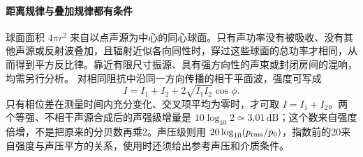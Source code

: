 \paragraph{距离规律与叠加规律都有条件}
球面面积 $4\pi r^2$ 来自以点声源为中心的同心球面。只有声功率没有被吸收、没有其他声源或反射波叠加，且辐射近似各向同性时，穿过这些球面的总功率才相同，从而得到平方反比律。靠近有限尺寸振源、具有强方向性的声束或封闭房间的混响，均需另行分析。
对相同阻抗中沿同一方向传播的相干平面波，强度可写成
\[
 I=I_1+I_2+2\sqrt{I_1I_2}\cos\phi.
\]
只有相位差在测量时间内充分变化、交叉项平均为零时，才可取 $I=I_1+I_2$。两个等强、不相干声源合成后的声强级增量是 $10\log_{10}2\simeq3.01\,\mathrm{dB}$；这个数来自强度倍增，不是把原来的分贝数再乘2。声压级则用 $20\log_{10}(p_{\rm rms}/p_0)$，指数前的20来自强度与声压平方的关系，使用时还须给出参考声压和介质条件。
